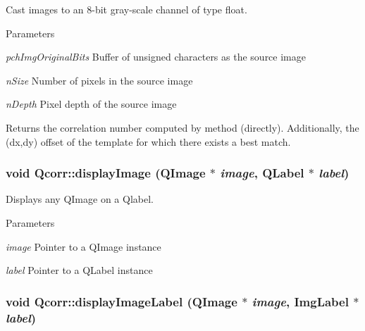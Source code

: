 Cast images to an 8-\/bit gray-\/scale channel of type float. 
\begin{DoxyParams}{Parameters}
\item[{\em pchImgOriginalBits}]Buffer of unsigned characters as the source image \item[{\em nSize}]Number of pixels in the source image \item[{\em nDepth}]Pixel depth of the source image \end{DoxyParams}
\begin{DoxyReturn}{Returns}
the correlation number computed by method (directly). Additionally, the (dx,dy) offset of the template for which there exists a best match. 
\end{DoxyReturn}
\hypertarget{classQcorr_a925b0715143a0afa981851547f8b9256}{
\subsubsection[{displayImage}]{\setlength{\rightskip}{0pt plus 5cm}void Qcorr::displayImage (QImage $\ast$ {\em image}, \/  QLabel $\ast$ {\em label})}}
\label{classQcorr_a925b0715143a0afa981851547f8b9256}


Displays any QImage on a Qlabel. 
\begin{DoxyParams}{Parameters}
\item[{\em image}]Pointer to a QImage instance \item[{\em label}]Pointer to a QLabel instance \end{DoxyParams}
\hypertarget{classQcorr_afddb022a6024a32be3b47016308d6c50}{
\subsubsection[{displayImageLabel}]{\setlength{\rightskip}{0pt plus 5cm}void Qcorr::displayImageLabel (QImage $\ast$ {\em image}, \/  {\bf ImgLabel} $\ast$ {\em label})}}
\label{classQcorr_afddb022a6024a32be3b47016308d6c50}


